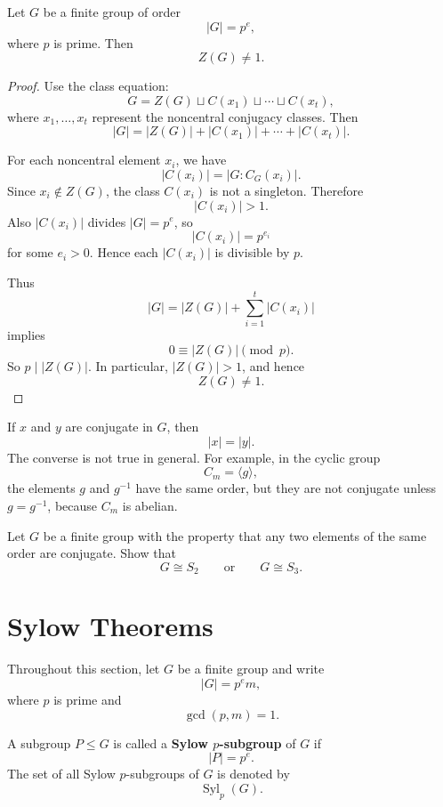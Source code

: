 \begin{theorem}\label{thm:p-group-center}
Let $G$ be a finite group of order
\[
    |G|=p^e,
\]
where $p$ is prime. Then
\[
    Z(G)\neq 1.
\]
\end{theorem}

\begin{proof}
Use the class equation:
\[
    G
    =
    Z(G)\sqcup C(x_1)\sqcup\cdots\sqcup C(x_t),
\]
where $x_1,\ldots,x_t$ represent the noncentral conjugacy classes. Then
\[
    |G|
    =
    |Z(G)|+|C(x_1)|+\cdots+|C(x_t)|.
\]

For each noncentral element $x_i$, we have
\[
    |C(x_i)|=|G:C_G(x_i)|.
\]
Since $x_i\notin Z(G)$, the class $C(x_i)$ is not a singleton. Therefore
\[
    |C(x_i)|>1.
\]
Also $|C(x_i)|$ divides $|G|=p^e$, so
\[
    |C(x_i)|=p^{e_i}
\]
for some $e_i>0$. Hence each $|C(x_i)|$ is divisible by $p$.

Thus
\[
    |G|
    =
    |Z(G)|+\sum_{i=1}^t |C(x_i)|
\]
implies
\[
    0\equiv |Z(G)| \pmod p.
\]
So $p\mid |Z(G)|$. In particular, $|Z(G)|>1$, and hence
\[
    Z(G)\neq 1.
\]
\end{proof}

\begin{remark}
If $x$ and $y$ are conjugate in $G$, then
\[
    |x|=|y|.
\]
The converse is not true in general. For example, in the cyclic group
\[
    C_m=\langle g\rangle,
\]
the elements $g$ and $g^{-1}$ have the same order, but they are not conjugate unless
$g=g^{-1}$, because $C_m$ is abelian.
\end{remark}

\begin{exercise}
Let $G$ be a finite group with the property that any two elements of the same order are conjugate. Show that
\[
    G\cong S_2
    \qquad\text{or}\qquad
    G\cong S_3.
\]
\end{exercise}

\section{Sylow Theorems}

Throughout this section, let $G$ be a finite group and write
\[
    |G|=p^e m,
\]
where $p$ is prime and
\[
    \gcd(p,m)=1.
\]

\begin{definition}
A subgroup $P\leq G$ is called a \textbf{Sylow $p$-subgroup} of $G$ if
\[
    |P|=p^e.
\]
The set of all Sylow $p$-subgroups of $G$ is denoted by
\[
    \operatorname{Syl}_p(G).
\]
\end{definition}

